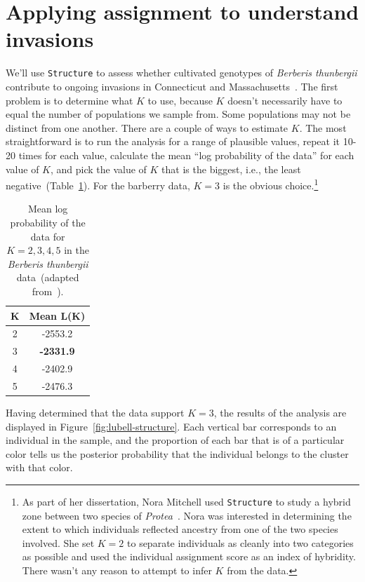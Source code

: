 \section*{Applying assignment to understand invasions}

We'll use {\tt Structure} to
assess whether cultivated genotypes of {\it Berberis
  thunbergii\/}
contribute to ongoing invasions in Connecticut and
Massachusetts~\cite{Lubell-etal-2008}. The first problem is to determine what $K$
to use, because $K$ doesn't necessarily have to equal the number of
populations we sample from. Some populations may not be distinct from
one another. There are a couple of ways to estimate $K$. The most
straightforward is to run the analysis for a range of plausible
values, repeat it 10-20 times for each value, calculate the mean ``log
probability of the data'' for each value of $K$, and pick the value of
$K$ that is the biggest, i.e., the least
negative~(Table~\ref{table:berberis-k}). For the barberry data, $K=3$
is the obvious choice.\footnote{As part of her dissertation, Nora
  Mitchell used {\tt Structure} to study a hybrid zone between two
  species of {\it Protea}~\cite{Mitchell-Holsinger-2018}. Nora was
  interested in determining the extent to which individuals reflected
  ancestry from one of the two species involved. She set $K=2$ to
  separate individuals as cleanly into two categories as possible and
  used the individual assignment score as an index of hybridity. There
  wasn't any reason to attempt to infer $K$ from the data.}

\begin{table}
\begin{center}
\begin{tabular}{cc}
\hline\hline
K & Mean L(K) \\
\hline
2 & -2553.2 \\
3 & {\bf -2331.9} \\
4 & -2402.9 \\
5 & -2476.3 \\
\hline
\end{tabular}
\end{center}
\caption{Mean log probability of the data for $K=2,3,4,5$ in the {\it
    Berberis thunbergii\/} data~(adapted
  from~\cite{Lubell-etal-2008}).}\label{table:berberis-k}
\end{table}

Having determined that the data support $K=3$, the results of the
analysis are displayed in Figure~\ref{fig:lubell-structure}. Each
vertical bar corresponds to an individual in the sample, and the
proportion of each bar that is of a particular color tells us the
posterior probability that the individual belongs to the cluster with
that color.

